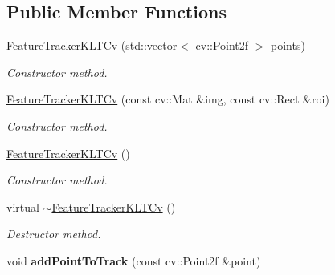 \subsection*{Public Member Functions}
\begin{DoxyCompactItemize}
\item 
\hypertarget{class_viscv_1_1_feature_tracker_k_l_t_cv_afec5e8db43cff5865d01a6aefa571f75}{}\hyperlink{class_viscv_1_1_feature_tracker_k_l_t_cv_afec5e8db43cff5865d01a6aefa571f75}{Feature\+Tracker\+K\+L\+T\+Cv} (std\+::vector$<$ cv\+::\+Point2f $>$ points)\label{class_viscv_1_1_feature_tracker_k_l_t_cv_afec5e8db43cff5865d01a6aefa571f75}

\begin{DoxyCompactList}\small\item\em Constructor method. \end{DoxyCompactList}\item 
\hypertarget{class_viscv_1_1_feature_tracker_k_l_t_cv_ad31a41e54b06155a819d91ddd00a2e8a}{}\hyperlink{class_viscv_1_1_feature_tracker_k_l_t_cv_ad31a41e54b06155a819d91ddd00a2e8a}{Feature\+Tracker\+K\+L\+T\+Cv} (const cv\+::\+Mat \&img, const cv\+::\+Rect \&roi)\label{class_viscv_1_1_feature_tracker_k_l_t_cv_ad31a41e54b06155a819d91ddd00a2e8a}

\begin{DoxyCompactList}\small\item\em Constructor method. \end{DoxyCompactList}\item 
\hypertarget{class_viscv_1_1_feature_tracker_k_l_t_cv_a92b21030b56cbc6f5bd865dadb2f88ac}{}\hyperlink{class_viscv_1_1_feature_tracker_k_l_t_cv_a92b21030b56cbc6f5bd865dadb2f88ac}{Feature\+Tracker\+K\+L\+T\+Cv} ()\label{class_viscv_1_1_feature_tracker_k_l_t_cv_a92b21030b56cbc6f5bd865dadb2f88ac}

\begin{DoxyCompactList}\small\item\em Constructor method. \end{DoxyCompactList}\item 
\hypertarget{class_viscv_1_1_feature_tracker_k_l_t_cv_a401364423c0eb5076abe2b69c713bdd6}{}virtual \hyperlink{class_viscv_1_1_feature_tracker_k_l_t_cv_a401364423c0eb5076abe2b69c713bdd6}{$\sim$\+Feature\+Tracker\+K\+L\+T\+Cv} ()\label{class_viscv_1_1_feature_tracker_k_l_t_cv_a401364423c0eb5076abe2b69c713bdd6}

\begin{DoxyCompactList}\small\item\em Destructor method. \end{DoxyCompactList}\item 
\hypertarget{class_viscv_1_1_feature_tracker_k_l_t_cv_a2cc406a5869c16af6c0a0eefa34878ed}{}void {\bfseries add\+Point\+To\+Track} (const cv\+::\+Point2f \&point)\label{class_viscv_1_1_feature_tracker_k_l_t_cv_a2cc406a5869c16af6c0a0eefa34878ed}


\end{DoxyCompactItemize}
